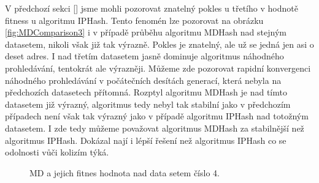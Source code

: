 V předchozí sekci [] jsme mohli pozorovat znatelný pokles u třetího v hodnotě fitness u algoritmu IPHash. Tento fenomén lze
pozorovat na obrázku \ref{fig:MDComparison3} i v případě průběhu algoritmu MDHash nad stejným datasetem, nikoli však již
tak výrazně. Pokles je znatelný, ale už se jedná jen asi o deset adres. I nad třetím datasetem jasně dominuje algoritmus náhodného
prohledávání, tentokrát ale výrazněji. Můžeme zde pozorovat rapidní konvergenci náhodného prohledávání v počátečních desítách
generací, která nebyla na předchozích datasetech přítomná. Rozptyl algoritmu MDHash je nad tímto datasetem již výrazný, algoritmus
tedy nebyl tak stabilní jako v předchozím případech není však tak výrazný jako v případě algoritmu IPHash nad totožným datasetem.
I zde tedy můžeme považovat algoritmus MDHash za stabilnější než algoritmus IPHash. Dokázal nají i lépší řešení než algoritmus
IPHash co se odolnosti vůči kolizím týká.

\begin{figure}[!ht]
	\centering
	\caption{MD a jejich fitnes hodnota nad data setem číslo 4.}
	\label{fig:MDComparison4}
\end{figure}

